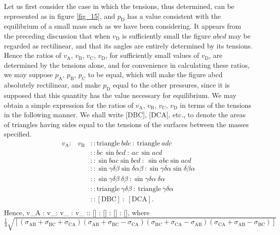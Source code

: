 \documentclass[12pt]{article}
\newcommand{\dd}{\delta}
\begin{document}
Let us first consider the case in which the tensions, thus determined, can be represented as in figure \ref{fig_15}, and $p_\text{D}$ has a value consistent with the equilibrium of a small mass such as we have been considering. It appears from  the preceding discussion that when $v_\text{D}$ is sufficiently small the figure $abcd$ may be regarded as rectilinear, and that its angles are entirely determined by its tensions. Hence the ratios of $v_\text{A}$, $v_\text{B}$, $v_\text{C}$, $v_\text{D}$, for sufficiently small values of $v_\text{D}$, are determined by the tensions alone, and for convenience in calculating these ratios, we may suppose $p_\text{A}$, $p_\text{B}$, $p_\text{C}$ to be equal, which will make the figure abcd absolutely rectilinear, and make $p_\text{D}$ equal to the other pressures, since it is supposed that this quantity has the value necessary for equilibrium. We may obtain a simple expression for the ratios of $v_\text{A}$, $v_\text{B}$, $v_\text{C}$, $v_\text{D}$ in terms of the tensions in the following manner. We shall write [DBC], [DCA], etc., to denote the areas of triangles having sides equal to the tensions of the surfaces between the masses specified.
\begin{equation*}\begin{array}{ccl}
v_\text{A}: & v_\text{B} &:: \text{triangle}\ bdc \ : \ \text{triangle} \ adc \\
 & &:: bc\, \sin bcd \ : \ ac \, \sin acd \\
& &:: \sin bac \sin bcd \ :\  \sin abc \sin acd \\
& &:: \sin \gamma \dd \beta \sin \dd \alpha \beta \ :  \sin \gamma \dd \alpha \sin \dd\beta\alpha \\ 
& &:: \sin \gamma \dd \beta \ \dd\beta \ : \sin \gamma \dd \alpha \ \dd\alpha \\
& &:: \text{triangle} \ \gamma \dd \beta \ : \ \text{triangle} \ \gamma \dd \alpha \\
& &:: [\text{DBC}] \ : \  [\text{DCA}]. \\
\end{array}\end{equation*}
Hence,
\eqs v_A : v_:  v_ : v_ :: [] : [] : [] : [],  \label{634} \eqe
where
$$\tfrac{1}{4} \sqrt{\left[ (\sigma_{\text{AB}}+ \sigma_{\text{BC}} +  \sigma_{\text{CA}})(\sigma_{\text{AB}} + \sigma_{\text{BC}} -  \sigma_{\text{CA}})(\sigma_{\text{BC}} +  \sigma_{\text{CA}} - \sigma_{\text{AB}})( \sigma_{\text{CA}} + \sigma_{\text{AB}} - \sigma_{\text{BC}})\right]}$$
\end{document}
